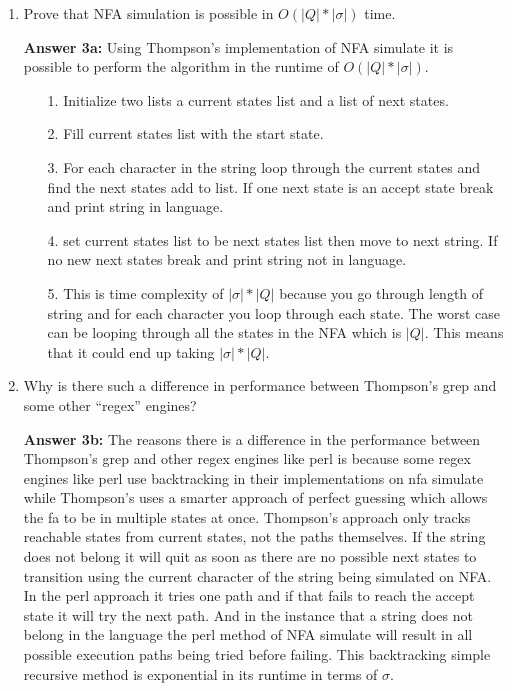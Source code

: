 \documentclass[12pt,letterpaper]{ntdhw}
\begin{document}
\begin{enumerate}
  \begin{enumerate}
    \item Prove that NFA simulation is possible in $O(|Q|*|\sigma|)$
      time.%
      \par \textbf{Answer 3a:} Using Thompson's implementation of NFA simulate it is possible to perform the algorithm in the runtime of $O(|Q|*|\sigma|)$. 
      \begin{enumerate}
          \item[1.] Initialize two lists a current states list and a list of next states.
          \item[2.]  Fill current states list with the start state.
          \item[3.] For each character in the string loop through the current states and find the next states add to list. If one next state is an accept state break and print string in language. 
          \item[4.] set current states list to be next states list then move to next string. If no new next states break and print string not in language.
          \item[5.] This is time complexity of $|\sigma| * |Q|$ because you go through length of string and for each character you loop through each state. The worst case can be looping through all the states in the NFA which is $|Q|$. This means that it could end up taking  $|\sigma| * |Q|$.
      \end{enumerate}

    \item Why is there such a difference in performance between
      Thompson's grep and some other ``regex'' engines?
      \par \textbf{Answer 3b:} The reasons there is a difference in the performance between Thompson's grep and other regex engines like perl is because some regex engines like perl use backtracking in their implementations on nfa simulate while Thompson's uses a smarter approach of perfect guessing which allows the fa to be in multiple states at once. Thompson's approach only tracks reachable states from current states, not the paths themselves. If the string does not belong it will quit as soon as there are no possible next states to transition using the current character of the string being simulated on NFA. In the perl approach it tries one path and if that fails to reach the accept state it will try the next path. And in the instance that a string does not belong in the language the perl method of NFA simulate will result in all possible execution paths being tried before failing. This backtracking simple recursive method is exponential in its runtime in terms of $\sigma$. 
  \end{enumerate}




\end{enumerate}
\end{document}
